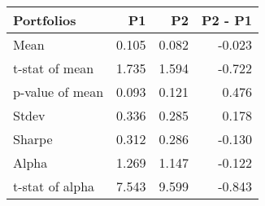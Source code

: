 \begin{tabular}{lrrr}
\toprule
Portfolios & P1 & P2 & P2 - P1 \\
\midrule
Mean & 0.105 & 0.082 & -0.023 \\
t-stat of mean & 1.735 & 1.594 & -0.722 \\
p-value of mean & 0.093 & 0.121 & 0.476 \\
Stdev & 0.336 & 0.285 & 0.178 \\
Sharpe & 0.312 & 0.286 & -0.130 \\
Alpha & 1.269 & 1.147 & -0.122 \\
t-stat of alpha & 7.543 & 9.599 & -0.843 \\
\bottomrule
\end{tabular}
